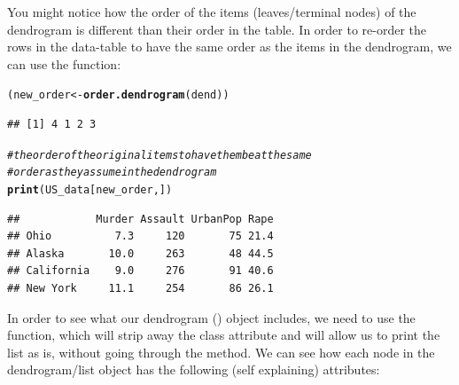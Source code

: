 \documentclass[shortnames,nojss,article]{jss}\usepackage[]{graphicx}\usepackage[]{color}
\makeatletter
\newcommand{\hlcom}[1]{\textcolor[rgb]{0.678,0.584,0.686}{\textit{#1}}}%
\newcommand{\hlstd}[1]{\textcolor[rgb]{0.345,0.345,0.345}{#1}}%
\newcommand{\hlkwb}[1]{\textcolor[rgb]{0.69,0.353,0.396}{#1}}%
\newcommand{\hlkwd}[1]{\textcolor[rgb]{0.737,0.353,0.396}{\textbf{#1}}}%
\newenvironment{kframe}{%
 \def\at@end@of@kframe{}%
 \ifinner\ifhmode%
  \def\at@end@of@kframe{\end{minipage}}%
  \begin{minipage}{\columnwidth}%
 \fi\fi%
 \def\FrameCommand##1{\hskip\@totalleftmargin \hskip-\fboxsep
 \colorbox{shadecolor}{##1}\hskip-\fboxsep
     \hskip-\linewidth \hskip-\@totalleftmargin \hskip\columnwidth}%
 \MakeFramed {\advance\hsize-\width
   \@totalleftmargin\z@ \linewidth\hsize
   \@setminipage}}%
 {\par\unskip\endMakeFramed%
 \at@end@of@kframe}
\newenvironment{knitrout}{}{} %
\makeatother
\begin{document}
You might notice how the order of the items (leaves/terminal nodes) of the dendrogram is different than their order in the table. In order to re-order the rows in the data-table to have the same order as the items in the dendrogram, we can use the  function:

\begin{knitrout}
\color{fgcolor}\begin{kframe}
\begin{alltt}
\hlstd{(new_order} \hlkwb{<-} \hlkwd{order.dendrogram}\hlstd{(dend))}
\end{alltt}
\begin{verbatim}
## [1] 4 1 2 3
\end{verbatim}
\begin{alltt}
\hlcom{# the order of the original items to have them be at the same}
\hlcom{# order as they assume in the dendrogram}
\hlkwd{print}\hlstd{(US_data[new_order, ])}
\end{alltt}
\begin{verbatim}
##            Murder Assault UrbanPop Rape
## Ohio          7.3     120       75 21.4
## Alaska       10.0     263       48 44.5
## California    9.0     276       91 40.6
## New York     11.1     254       86 26.1
\end{verbatim}
\end{kframe}
\end{knitrout}



In order to see what our dendrogram () object includes, we need to use the  function, which will strip away the class attribute and will allow us to print the list as is, without going through the  method. We can see how each node in the dendrogram/list object has the following (self explaining) attributes:
\end{document}
